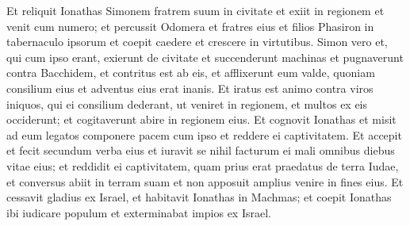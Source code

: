 \begin{biblechapter}
\begin{biblechapter}
\begin{biblechapter}
\begin{biblechapter}
\begin{biblechapter}
\begin{biblechapter}
\begin{biblechapter}
\begin{biblechapter}
\begin{biblechapter}
\verse Et reliquit Ionathas Simonem fratrem suum in civitate et exiit in regionem et venit cum numero; 
 \verse et percussit Odomera et fratres eius et filios Phasiron in tabernaculo ipsorum et coepit caedere et crescere in virtutibus. 
\verse Simon vero et, qui cum ipso erant, exierunt de civitate et succenderunt machinas 
\verse et pugnaverunt contra Bacchidem, et contritus est ab eis, et afflixerunt eum valde, quoniam consilium eius et adventus eius erat inanis. 
\verse Et iratus est animo contra viros iniquos, qui ei consilium dederant, ut veniret in regionem, et multos ex eis occiderunt; et cogitaverunt abire in regionem eius. 
\verse Et cognovit Ionathas et misit ad eum legatos componere pacem cum ipso et reddere ei captivitatem. 
\verse Et accepit et fecit secundum verba eius et iuravit se nihil facturum ei mali omnibus diebus vitae eius; 
\verse et reddidit ei captivitatem, quam prius erat praedatus de terra Iudae, et conversus abiit in terram suam et non apposuit amplius venire in fines eius. 
\verse Et cessavit gladius ex Israel, et habitavit Ionathas in Machmas; et coepit Ionathas ibi iudicare populum et exterminabat impios ex Israel.
 

\end{biblechapter}
\end{biblechapter}
\end{biblechapter}
\end{biblechapter}
\end{biblechapter}
\end{biblechapter}
\end{biblechapter}
\end{biblechapter}
\end{biblechapter}
